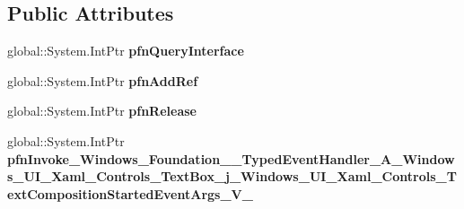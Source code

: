 \subsection*{Public Attributes}
\begin{DoxyCompactItemize}
\item 
\mbox{\label{struct_windows_1_1_foundation_1_1_typed_event_handler___a___windows___u_i___xaml___controls___tecddfdbbe1975f56736362b195b332de6_a1e6afb614f566997a88b44ab9475bc0d}} 
global\+::\+System.\+Int\+Ptr {\bfseries pfn\+Query\+Interface}
\item 
\mbox{\label{struct_windows_1_1_foundation_1_1_typed_event_handler___a___windows___u_i___xaml___controls___tecddfdbbe1975f56736362b195b332de6_acb0f7f6d1b5f3aa81e21a69ef96d9473}} 
global\+::\+System.\+Int\+Ptr {\bfseries pfn\+Add\+Ref}
\item 
\mbox{\label{struct_windows_1_1_foundation_1_1_typed_event_handler___a___windows___u_i___xaml___controls___tecddfdbbe1975f56736362b195b332de6_a8a9aebd281fab8a0a71bd0eb6da11dfd}} 
global\+::\+System.\+Int\+Ptr {\bfseries pfn\+Release}
\item 
\mbox{\label{struct_windows_1_1_foundation_1_1_typed_event_handler___a___windows___u_i___xaml___controls___tecddfdbbe1975f56736362b195b332de6_a23aa85ce9823a1e34c82ba13769d6f61}} 
global\+::\+System.\+Int\+Ptr {\bfseries pfn\+Invoke\+\_\+\+Windows\+\_\+\+Foundation\+\_\+\+\_\+\+Typed\+Event\+Handler\+\_\+\+A\+\_\+\+Windows\+\_\+\+U\+I\+\_\+\+Xaml\+\_\+\+Controls\+\_\+\+Text\+Box\+\_\+j\+\_\+\+Windows\+\_\+\+U\+I\+\_\+\+Xaml\+\_\+\+Controls\+\_\+\+Text\+Composition\+Started\+Event\+Args\+\_\+\+V\+\_\+}
\end{DoxyCompactItemize}
